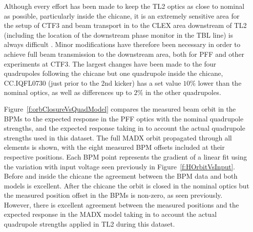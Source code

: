 
Although every effort has been made to keep the TL2 optics as close to nominal as possible, particularly inside the chicane, it is an extremely sensitive area for the setup of CTF3 and beam transport in to the CLEX area downstream of TL2 (including the location of the downstream phase monitor in the TBL line) is always difficult \cite{piotrPriv}. Minor modifications have therefore been necessary in order to achieve full beam transmission to the downstream area, both for PFF and other experiments at CTF3. The largest changes have been made to the four quadrupoles following the chicane but one quadrupole inside the chicane, CC.IQFL0730 (just prior to the 2nd kicker) has a set value \(10\%\) lower than the nominal optics, as well as differences up to \(2\%\) in the other quadrupoles. 

Figure~\ref{f:orbClosureVsQuadModel} compares the measured beam orbit
 in the BPMs to the expected response in the PFF optics with the 
 nominal quadrupole strengths, and the expected response taking in to
 account the actual quadrupole strengths used in this dataset.
 The full MADX orbit propagated through all elements is shown, with the eight measured BPM offsets included at their respective positions. 
 Each BPM point represents the gradient of a linear fit using the variation with input voltage seen previously in Figure~\ref{f:HOrbitVsInput}.
 Before and inside the chicane the agreement between the BPM data and both models is excellent.
  After the chicane the orbit is closed in the nominal optics but the 
  measured position offset in the BPMs is non-zero, as seen previously.
  However, there is excellent agreement between the measured positions
  and the expected response in the MADX model taking in to account the 
  actual quadrupole strengths applied in TL2 during this dataset.


